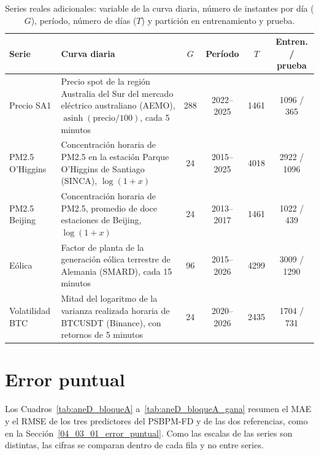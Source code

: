 \begin{table}[H]
\centering\small
\setlength{\tabcolsep}{3.5pt}
\caption{Series reales adicionales: variable de la curva diaria, número de instantes por día ($G$), período, número de días ($T$) y partición en entrenamiento y prueba.}
\label{tab:aneD_series}
\begin{tabular}{l p{} c c c c}
\hline
Serie & Curva diaria & $G$ & Período & $T$ & Entren. / prueba \\
\hline
Precio SA1 & Precio spot de la región Australia del Sur del mercado eléctrico australiano (AEMO), $\operatorname{asinh}(\text{precio}/100)$, cada 5 minutos & 288 & 2022--2025 & 1461 & 1096 / 365 \\
PM2.5 O'Higgins & Concentración horaria de PM2.5 en la estación Parque O'Higgins de Santiago (SINCA), $\log(1 + x)$ & 24 & 2015--2025 & 4018 & 2922 / 1096 \\
PM2.5 Beijing & Concentración horaria de PM2.5, promedio de doce estaciones de Beijing, $\log(1 + x)$ & 24 & 2013--2017 & 1461 & 1022 / 439 \\
Eólica & Factor de planta de la generación eólica terrestre de Alemania (SMARD), cada 15 minutos & 96 & 2015--2026 & 4299 & 3009 / 1290 \\
Volatilidad BTC & Mitad del logaritmo de la varianza realizada horaria de BTCUSDT (Binance), con retornos de 5 minutos & 24 & 2020--2026 & 2435 & 1704 / 731 \\
\hline
\end{tabular}
\end{table}

\section{Error puntual}
\label{aneD_00_02_error_puntual}

Los Cuadros~\ref{tab:aneD_bloqueA} a~\ref{tab:aneD_bloqueA_gana} resumen el MAE y el RMSE de los tres predictores del PSBPM-FD y de las dos referencias, como en la Sección~\ref{04_03_01_error_puntual}. Como las escalas de las series son distintas, las cifras se comparan dentro de cada fila y no entre series.

